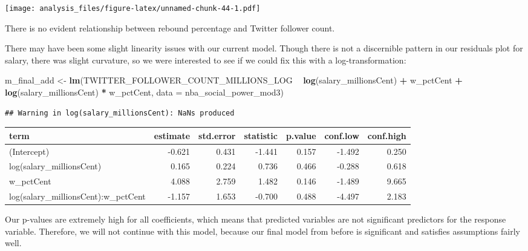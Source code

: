 \documentclass[]{article}
\newenvironment{Shaded}{\begin{snugshade}}{\end{snugshade}}
\newcommand{\DataTypeTok}[1]{\textcolor[rgb]{0.13,0.29,0.53}{#1}}
\newcommand{\DecValTok}[1]{\textcolor[rgb]{0.00,0.00,0.81}{#1}}
\newcommand{\KeywordTok}[1]{\textcolor[rgb]{0.13,0.29,0.53}{\textbf{#1}}}
\newcommand{\NormalTok}[1]{#1}
\newcommand{\OperatorTok}[1]{\textcolor[rgb]{0.81,0.36,0.00}{\textbf{#1}}}
\newcommand{\OtherTok}[1]{\textcolor[rgb]{0.56,0.35,0.01}{#1}}
\newcommand{\StringTok}[1]{\textcolor[rgb]{0.31,0.60,0.02}{#1}}
\begin{document}
\texttt{[image: analysis\_files/figure-latex/unnamed-chunk-44-1.pdf]}

There is no evident relationship between rebound percentage and Twitter
follower count.

There may have been some slight linearity issues with our current model.
Though there is not a discernible pattern in our residuals plot for
salary, there was slight curvature, so we were interested to see if we
could fix this with a log-transformation:

\begin{Shaded}
\begin{Highlighting}[]
\NormalTok{m_final_add <-}\StringTok{ }\KeywordTok{lm}\NormalTok{(TWITTER_FOLLOWER_COUNT_MILLIONS_LOG }\OperatorTok{~}\StringTok{ }\KeywordTok{log}\NormalTok{(salary_millionsCent) }
                     \OperatorTok{+}\StringTok{ }\NormalTok{w_pctCent }
                  \OperatorTok{+}\StringTok{ }\KeywordTok{log}\NormalTok{(salary_millionsCent) }\OperatorTok{*}\StringTok{ }\NormalTok{w_pctCent,}
               \DataTypeTok{data =}\NormalTok{ nba_social_power_mod3)}
\end{Highlighting}
\end{Shaded}

\begin{verbatim}
## Warning in log(salary_millionsCent): NaNs produced
\end{verbatim}

\begin{Shaded}
\end{Shaded}

\begin{longtable}[]{@{}lrrrrrr@{}}
\toprule
term & estimate & std.error & statistic & p.value & conf.low &
conf.high\tabularnewline
\midrule
\endhead
(Intercept) & -0.621 & 0.431 & -1.441 & 0.157 & -1.492 &
0.250\tabularnewline
log(salary\_millionsCent) & 0.165 & 0.224 & 0.736 & 0.466 & -0.288 &
0.618\tabularnewline
w\_pctCent & 4.088 & 2.759 & 1.482 & 0.146 & -1.489 &
9.665\tabularnewline
log(salary\_millionsCent):w\_pctCent & -1.157 & 1.653 & -0.700 & 0.488 &
-4.497 & 2.183\tabularnewline
\bottomrule
\end{longtable}

Our p-values are extremely high for all coefficients, which means that
predicted variables are not significant predictors for the response
variable. Therefore, we will not continue with this model, because our
final model from before is significant and satisfies assumptions fairly
well.
\end{document}
